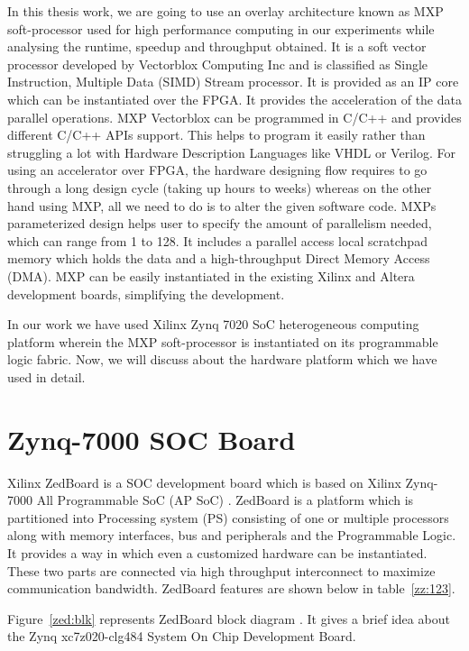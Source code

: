 In this thesis work, we are going to use an overlay architecture known as MXP soft-processor used for high performance computing in our experiments while analysing the runtime, speedup and throughput obtained. It is a soft vector processor developed by Vectorblox Computing Inc \cite{9} and is classified as Single Instruction, Multiple Data (SIMD) Stream processor. It is provided as an IP core which can be instantiated over the FPGA. It provides the acceleration of the data parallel operations. MXP Vectorblox can be programmed in C/C++ and provides different C/C++ APIs support. This helps to program it easily rather than struggling a lot with Hardware Description Languages like VHDL or Verilog. For using an accelerator over FPGA, the hardware designing flow requires to go through a long design cycle (taking up hours to weeks) whereas on the other hand using MXP, all we need to do is to alter the given software code. MXPs parameterized design helps user to specify the amount of parallelism needed, which can range from 1 to 128. It includes a parallel access local scratchpad memory which holds the data and a high-throughput Direct Memory Access (DMA). MXP can be easily instantiated in the existing Xilinx and Altera development boards, simplifying the development.

In our work we have used Xilinx Zynq 7020 SoC \cite{10} heterogeneous computing platform wherein the MXP soft-processor is instantiated on its programmable logic fabric. Now, we will discuss about the hardware platform which we have used in detail.


\section{Zynq-7000 SOC Board}

Xilinx ZedBoard is a SOC development board which is based on Xilinx Zynq-7000 All Programmable SoC (AP SoC) \cite{11}. ZedBoard is a platform which is partitioned into Processing system (PS) consisting of one or multiple processors along with memory interfaces, bus and peripherals and the Programmable Logic. It provides a way in which even a customized hardware can be instantiated. These two parts are connected via high throughput interconnect to maximize communication bandwidth. ZedBoard features are shown below in table~\ref{zz:123}.





Figure~\ref{zed:blk} represents ZedBoard block diagram \cite{12}. It gives a brief idea about the Zynq xc7z020-clg484 System On Chip Development Board.

